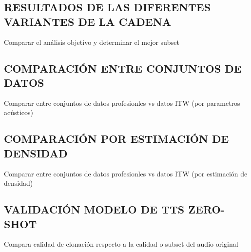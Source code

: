 \subsection{RESULTADOS DE LAS DIFERENTES VARIANTES DE LA CADENA}
Comparar el análisis objetivo y determinar el mejor subset

\subsection{COMPARACIÓN ENTRE CONJUNTOS DE DATOS}
Comparar entre conjuntos de datos profesionles vs datos ITW (por parametros acústicos)

\subsection{COMPARACIÓN POR ESTIMACIÓN DE DENSIDAD}
Comparar entre conjuntos de datos profesionles vs datos ITW (por estimación de densidad)

\subsection{VALIDACIÓN MODELO DE TTS ZERO-SHOT}
Compara calidad de clonación respecto a la calidad o subset del audio original
